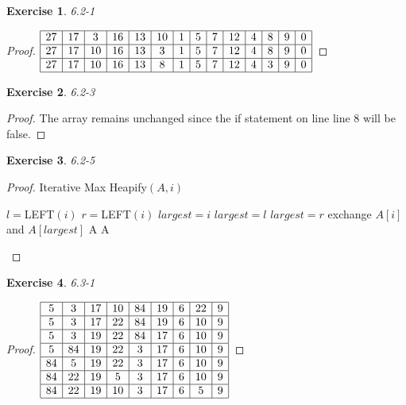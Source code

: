 \documentclass{article}
\newtheorem{th1}{Exercise}
\begin{document}
\begin{th1}\label{ex5}
6.2-1
\end{th1}
\begin{proof}
$
\begin{array}{|c|c|c|c|c|c|c|c|c|c|c|c|c|c|}
\hline
27&17&3&16&13&10&1&5&7&12&4&8&9&0\\
\hline
27&17&10&16&13&3&1&5&7&12&4&8&9&0\\
\hline
27&17&10&16&13&8&1&5&7&12&4&3&9&0\\
\hline
\end{array}
$
\end{proof}
\begin{th1}\label{ex6}
6.2-3
\end{th1}
\begin{proof}
The array remains unchanged since the if statement on line line 8 will be false.
\end{proof}
\begin{th1}\label{ex7}
6.2-5
\end{th1}
\begin{proof}
Iterative Max Heapify$(A,i)$
\begin{algorithm}
\begin{algorithmic}
\State $l =$LEFT$(i)$
\State $r =$LEFT$(i)$
\State $largest = i$
\State $largest =l$
\EndIf
{}
\State $largest =r$
\EndIf
{}
\State exchange $A[i]$ and $A[largest]$
\Else \Return A
\EndIf
\EndWhile
\State \Return A
\end{algorithmic}
\end{algorithm}
\end{proof}
\begin{th1}\label{ex8}
6.3-1
\end{th1}
\begin{proof}
$
\begin{array}{|c|c|c|c|c|c|c|c|c|}
\hline
5&3&17&10&84&19&6&22&9\\
\hline
5&3&17&22&84&19&6&10&9\\
\hline
5&3&19&22&84&17&6&10&9\\
\hline
5&84&19&22&3&17&6&10&9\\
\hline
84&5&19&22&3&17&6&10&9\\
\hline
84&22&19&5&3&17&6&10&9\\
\hline
84&22&19&10&3&17&6&5&9\\
\hline
\end{array}
$
\end{proof}
\end{document}
